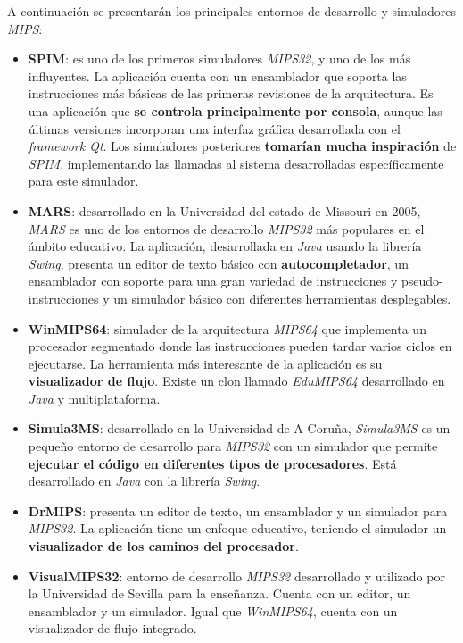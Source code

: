 \noindent A continuación se presentarán los principales
entornos de desarrollo y simuladores \textit{MIPS}:
\begin{itemize}
    \item \textbf{SPIM}\cite{SPIM}: es uno de los primeros simuladores
    \textit{MIPS32}, y uno de los más influyentes.
    La aplicación cuenta con un ensamblador que soporta las
    instrucciones más básicas de las primeras revisiones de la arquitectura.
    Es una aplicación que \textbf{se controla principalmente por consola},
    aunque las últimas versiones incorporan una interfaz gráfica
    desarrollada con el \textit{framework Qt}\cite{QT}.
    Los simuladores posteriores \textbf{tomarían mucha inspiración} de \textit{SPIM},
    implementando las llamadas al sistema desarrolladas específicamente
    para este simulador.
    \item \textbf{MARS}\cite{MARS}: desarrollado en la Universidad
    del estado de Missouri en 2005, \textit{MARS} es uno de los
    entornos de desarrollo \textit{MIPS32} más populares en el ámbito educativo.
    La aplicación, desarrollada en \textit{Java}\cite{JAVA}
    usando la librería \textit{Swing}\cite{SWING},
    presenta un editor de texto básico con \textbf{autocompletador}, un
    ensamblador con soporte para una gran variedad de instrucciones y
    pseudo-instrucciones y un simulador básico con diferentes herramientas
    desplegables.
    \item \textbf{WinMIPS64}\cite{WINMIPS64}: simulador
    de la arquitectura \textit{MIPS64} que implementa
    un procesador segmentado donde las instrucciones
    pueden tardar varios ciclos en ejecutarse.
    La herramienta más interesante de la aplicación
    es su \textbf{visualizador de flujo}.
    Existe un clon llamado \textit{EduMIPS64} desarrollado
    en \textit{Java} y multiplataforma.
    \item \textbf{Simula3MS}\cite{SIMULA3MS}: desarrollado en
    la Universidad de A Coruña, \textit{Simula3MS} es un
    pequeño entorno de desarrollo para \textit{MIPS32}
    con un simulador que permite \textbf{ejecutar el código en
    diferentes tipos de procesadores}.
    Está desarrollado en \textit{Java} con la librería \textit{Swing}.
    \item \textbf{DrMIPS}\cite{DRMIPS}: presenta un
    editor de texto, un ensamblador y un simulador
    para \textit{MIPS32}.
    La aplicación tiene un enfoque educativo, teniendo el simulador
    un \textbf{visualizador de los caminos del procesador}.
    \item \textbf{VisualMIPS32}\cite{VISUALMIPS32}: entorno
    de desarrollo \textit{MIPS32} desarrollado y
    utilizado por la Universidad de Sevilla para la enseñanza.
    Cuenta con un editor, un ensamblador y un simulador.
    Igual que \textit{WinMIPS64}, cuenta con un visualizador
    de flujo integrado.
\end{itemize}


